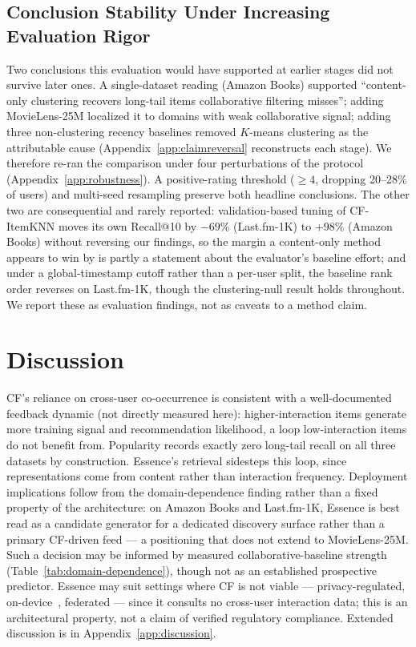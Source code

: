 \documentclass{article}
\begin{document}
\subsection{Conclusion Stability Under Increasing Evaluation Rigor}
\label{sec:conclusion-stability}

Two conclusions this evaluation would have supported at earlier stages did not survive later ones. A single-dataset reading (Amazon Books) supported ``content-only clustering recovers long-tail items collaborative filtering misses''; adding MovieLens-25M localized it to domains with weak collaborative signal; adding three non-clustering recency baselines removed $K$-means clustering as the attributable cause (Appendix~\ref{app:claimreversal} reconstructs each stage). We therefore re-ran the comparison under four perturbations of the protocol (Appendix~\ref{app:robustness}). A positive-rating threshold ($\geq 4$, dropping 20--28\% of users) and multi-seed resampling preserve both headline conclusions. The other two are consequential and rarely reported: validation-based tuning of CF-ItemKNN moves its own Recall@10 by $-69\%$ (Last.fm-1K) to $+98\%$ (Amazon Books) without reversing our findings, so the margin a content-only method appears to win by is partly a statement about the evaluator's baseline effort; and under a global-timestamp cutoff rather than a per-user split, the baseline rank order reverses on Last.fm-1K, though the clustering-null result holds throughout. We report these as evaluation findings, not as caveats to a method claim.

\section{Discussion}
\label{sec:discussion}

CF's reliance on cross-user co-occurrence is consistent with a well-documented feedback dynamic (not directly measured here): higher-interaction items generate more training signal and recommendation likelihood, a loop low-interaction items do not benefit from. Popularity records exactly zero long-tail recall on all three datasets by construction. Essence's retrieval sidesteps this loop, since representations come from content rather than interaction frequency. Deployment implications follow from the domain-dependence finding rather than a fixed property of the architecture: on Amazon Books and Last.fm-1K, Essence is best read as a candidate generator for a dedicated discovery surface rather than a primary CF-driven feed --- a positioning that does not extend to MovieLens-25M. Such a decision may be informed by measured collaborative-baseline strength (Table~\ref{tab:domain-dependence}), though not as an established prospective predictor. Essence may suit settings where CF is not viable --- privacy-regulated, on-device~\cite{yin2024}, federated --- since it consults no cross-user interaction data; this is an architectural property, not a claim of verified regulatory compliance. Extended discussion is in Appendix~\ref{app:discussion}.
\end{document}

